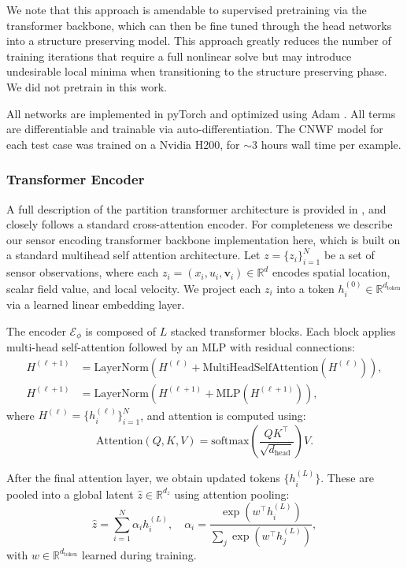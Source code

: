 \documentclass[onefignum,onetabnum]{siamart171218} %
\begin{document}
We note that this approach is amendable to supervised pretraining via the transformer backbone, which can then be fine tuned through the head networks into a structure preserving model. This approach greatly reduces the number of training iterations that require a full nonlinear solve but may introduce undesirable local minima when transitioning to the structure preserving phase. We did not pretrain in this work.

All networks are implemented in pyTorch \cite{DBLP:journals/corr/abs-1912-01703} and optimized using Adam \cite{kingma2014adam}. All terms are differentiable and trainable via auto-differentiation. The CNWF model for each test case was trained on a Nvidia H200, for $\sim$3 hours wall time per example.

\subsubsection*{Transformer Encoder}

A full description of the partition transformer architecture is provided in \cite{kinch2025structure}, and closely follows a standard cross-attention encoder. For completeness we describe our sensor encoding transformer backbone implementation here, which is built on a standard multihead self attention architecture.
Let \( z = \{ z_i \}_{i=1}^N \) be a set of sensor observations, where each \( z_i = (x_i, u_i, \mathbf{v}_i) \in \mathbb{R}^d \) encodes spatial location, scalar field value, and local velocity. We project each \( z_i \) into a token \( h_i^{(0)} \in \mathbb{R}^{d_{\text{token}}} \) via a learned linear embedding layer.

The encoder \( \mathcal{E}_\phi \) is composed of \( L \) stacked transformer blocks. Each block applies multi-head self-attention followed by an MLP with residual connections:
\[
\begin{aligned}
    H^{(\ell+1)} &= \text{LayerNorm} \left( H^{(\ell)} + \text{MultiHeadSelfAttention}(H^{(\ell)}) \right), \\
    H^{(\ell+1)} &= \text{LayerNorm} \left( H^{(\ell+1)} + \text{MLP}(H^{(\ell+1)}) \right),
\end{aligned}
\]
where \( H^{(\ell)} = \{ h_i^{(\ell)} \}_{i=1}^N \), and attention is computed using:
\[
    \text{Attention}(Q, K, V) = \text{softmax} \left( \frac{QK^\top}{\sqrt{d_{\text{head}}}} \right) V.
\]

After the final attention layer, we obtain updated tokens \( \{ h_i^{(L)} \} \). These are pooled into a global latent \( \hat{z} \in \mathbb{R}^{d_z} \) using attention pooling:
\[
    \hat{z} = \sum_{i=1}^N \alpha_i h_i^{(L)}, \quad \alpha_i = \frac{\exp(w^\top h_i^{(L)})}{\sum_j \exp(w^\top h_j^{(L)})},
\]
with \( w \in \mathbb{R}^{d_{\text{token}}} \) learned during training.
\end{document}
